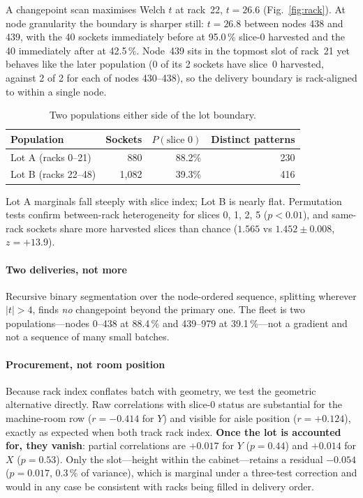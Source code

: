 \documentclass[10pt,conference]{IEEEtran}
\begin{document}
A changepoint scan maximises Welch $t$ at rack~22, $t=26.6$ (Fig.~\ref{fig:rack}). At node
granularity the boundary is sharper still: $t=26.8$ between nodes 438 and 439, with the 40 sockets
immediately before at 95.0\,\% slice-0 harvested and the 40 immediately after at 42.5\,\%.
Node~439 sits in the topmost slot of rack~21 yet behaves like the later population (0 of its 2
sockets have slice~0 harvested, against 2 of 2 for each of nodes 430--438), so the delivery
boundary is rack-aligned to within a single node.

\begin{table}[h]\centering\caption{Two populations either side of the lot boundary.}
\begin{tabular}{lrrr}\toprule
Population & Sockets & $P(\text{slice 0})$ & Distinct patterns\\\midrule
Lot A (racks 0--21) & 880 & 88.2\% & 230\\
Lot B (racks 22--48) & 1{,}082 & 39.3\% & 416\\
\bottomrule\end{tabular}\end{table}

Lot A marginals fall steeply with slice index; Lot B is nearly flat. Permutation tests confirm
between-rack heterogeneity for slices 0, 1, 2, 5 ($p<0.01$), and same-rack sockets share more
harvested slices than chance ($1.565$ vs $1.452\pm0.008$, $z=+13.9$).

\paragraph*{Two deliveries, not more} Recursive binary segmentation over the node-ordered
sequence, splitting wherever $|t|>4$, finds \emph{no} changepoint beyond the primary one. The
fleet is two populations---nodes 0--438 at 88.4\,\% and 439--979 at 39.1\,\%---not a gradient and
not a sequence of many small batches.

\paragraph*{Procurement, not room position} \label{par:geom} Because rack index conflates batch
with geometry, we test the geometric alternative directly. Raw correlations with slice-0 status are
substantial for the machine-room row ($r=-0.414$ for $Y$) and visible for aisle position
($r=+0.124$), exactly as expected when both track rack index. \textbf{Once the lot is accounted
for, they vanish}: partial correlations are $+0.017$ for $Y$ ($p=0.44$) and $+0.014$ for $X$
($p=0.53$). Only the slot---height within the cabinet---retains a residual $-0.054$ ($p=0.017$,
0.3\,\% of variance), which is marginal under a three-test correction and would in any case be
consistent with racks being filled in delivery order.
\end{document}
